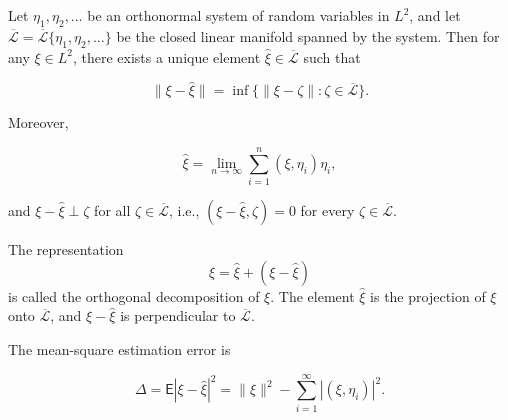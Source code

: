 Let $\eta_1, \eta_2, \ldots$ be an orthonormal system of random variables in $L^2$, and let $\overline{\mathcal{L}} = \overline{\mathcal{L}}\{\eta_1, \eta_2, \ldots\}$ be the closed linear manifold spanned by the system. Then for any $\xi \in L^2$, there exists a unique element $\hat{\xi} \in \overline{\mathcal{L}}$ such that

$$\|\xi - \hat{\xi}\| = \inf \{\|\xi - \zeta\| : \zeta \in \overline{\mathcal{L}}\}.$$

Moreover,

$$\hat{\xi} = \lim_{n \to \infty} \sum_{i=1}^{n} (\xi, \eta_i) \eta_i,$$

and $\xi - \hat{\xi} \perp \zeta$ for all $\zeta \in \overline{\mathcal{L}}$, i.e., $(\xi - \hat{\xi}, \zeta) = 0$ for every $\zeta \in \overline{\mathcal{L}}$.

The representation $$\xi = \hat{\xi} + (\xi - \hat{\xi})$$ is called the orthogonal decomposition of $\xi$. The element $\hat{\xi}$ is the projection of $\xi$ onto $\overline{\mathcal{L}}$, and $\xi - \hat{\xi}$ is perpendicular to $\overline{\mathcal{L}}$.

The mean-square estimation error is

$$\Delta = \mathsf{E}|\xi - \hat{\xi}|^2 = \|\xi\|^2 - \sum_{i=1}^{\infty} |(\xi, \eta_i)|^2.$$
